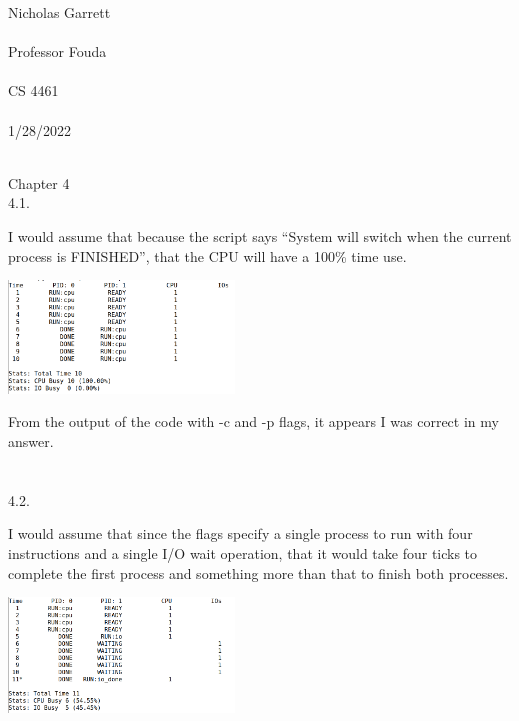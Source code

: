 \documentclass[12pt, a4paper]{article}
\begin{document}
\noindent
Nicholas Garrett\\ \\
Professor Fouda\\ \\
CS 4461\\ \\
1/28/2022\\ \\


\begin{center}
\end{center}

\noindent
Chapter 4\\

4.1.

	I would assume that because the script says ``System will switch when the current process is FINISHED'', that the CPU will have a 100\% time use.  \\
	\begin{center}
	\includegraphics[width=6cm]{hw1_4_1.png}\\
	\end{center}
	
	From the output of the code with -c and -p flags, it appears I was correct in my answer.\\ \\ \\
	
4.2.

	I would assume that since the flags specify a single process to run with four instructions and a single I/O wait operation, that it would take four ticks to complete the first process and something more than that to finish both processes.\\
	\begin{center}
	\includegraphics[width=6cm]{hw1_4_2.png}\\
	\end{center}
	
\end{document}
